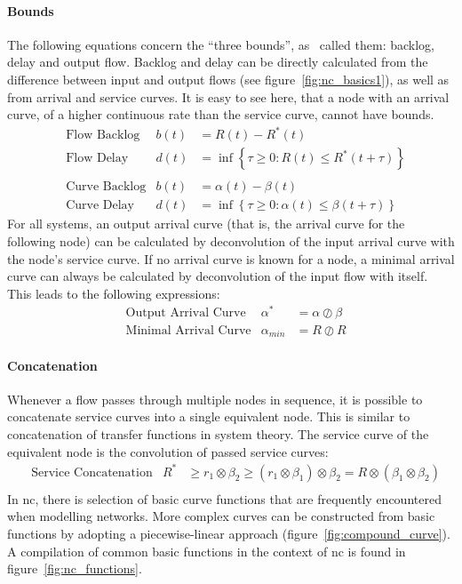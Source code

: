 \paragraph{Bounds}
The following equations concern the \enquote{three bounds}, as~\citeauthor{thiran_network_2001} called them: backlog, delay and output flow.
Backlog and delay can be directly calculated from the difference between input and output flows (see figure~\ref{fig:nc_basics1}), as well as from
arrival and service curves. It is easy to see here, that a node with an arrival curve, of a higher continuous rate than the service curve, cannot have bounds.
%
\begin{equation}
\begin{aligned}
&\text{Flow Backlog} &b(t) &= R(t) - R^*(t)\\[8pt]
&\text{Flow Delay} &d(t) &= \inf\left\{\tau \ge 0 : R(t) \le R^*(t+\tau) \right\}\\
\\
&\text{Curve Backlog} &b(t) &= \alpha(t) - \beta(t)\\[8pt]
&\text{Curve Delay} &d(t) &= \inf\left\{\tau \ge 0 : \alpha(t) \le \beta(t+\tau) \right\}
\end{aligned}
\end{equation}
%
For all systems, an output arrival curve (that is, the arrival curve for the following node) can be calculated by deconvolution
of the input arrival curve with the node's service curve. If no arrival curve is known for a node, a minimal arrival curve can
always be calculated by deconvolution of the input flow with itself.
This leads to the following expressions:
%
\begin{equation}
\begin{aligned}
&\text{Output Arrival Curve} &\alpha^* &= \alpha \oslash \beta\\[8pt]
&\text{Minimal Arrival Curve} &\alpha_{min} &= R \oslash R
\label{eq:nc_outp_arr}
\end{aligned}
\end{equation}
%
\paragraph{Concatenation}
Whenever a flow passes through multiple nodes in sequence, it is possible to concatenate service curves into a single equivalent node. This is similar to concatenation of transfer functions in system theory.
The service curve of the equivalent node is the convolution of passed service curves:
%
\begin{equation}
\begin{aligned}
&\text{Service Concatenation} &R^* &\ge r_1 \otimes \beta_2 \ge (r_1 \otimes \beta_1) \otimes \beta_2 = R \otimes (\beta_1 \otimes \beta_2)\\
\end{aligned}
\end{equation}
%
In \gls{nc}, there is selection of basic curve functions that are frequently encountered when modelling networks. More complex curves can be constructed from basic functions
by adopting a piecewise-linear approach (figure~\ref{fig:compound_curve}). A compilation of common basic functions in the context of \gls{nc} is found in figure~\ref{fig:nc_functions}.

